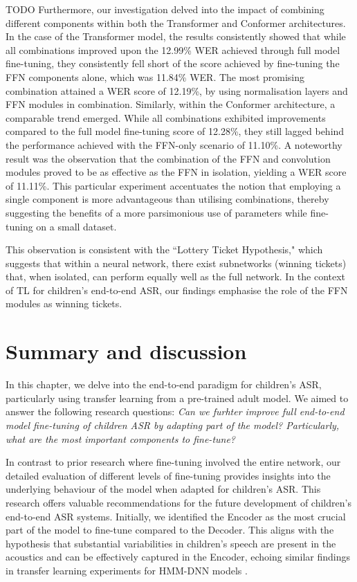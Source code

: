 TODO
Furthermore, our investigation delved into the impact of combining different components within both the Transformer and Conformer architectures. In the case of the Transformer model, the results consistently showed that while all combinations improved upon the 12.99\% \ac{WER} achieved through full model fine-tuning, they consistently fell short of the score achieved by fine-tuning the \ac{FFN} components alone, which was 11.84\% \ac{WER}. The most promising combination attained a \ac{WER} score of 12.19\%, by using normalisation layers and \ac{FFN} modules in combination.
Similarly, within the Conformer architecture, a comparable trend emerged. While all combinations exhibited improvements compared to the full model fine-tuning score of 12.28\%, they still lagged behind the performance achieved with the \ac{FFN}-only scenario of 11.10\%. A noteworthy result was the observation that the combination of the \ac{FFN} and convolution modules proved to be as effective as the \ac{FFN} in isolation, yielding a \ac{WER} score of 11.11\%. This particular experiment accentuates the notion that employing a single component is more advantageous than utilising combinations, thereby suggesting the benefits of a more parsimonious use of parameters while fine-tuning on a small dataset.

This observation is consistent with the ``Lottery Ticket Hypothesis," which suggests that within a neural network, there exist subnetworks (winning tickets) that, when isolated, can perform equally well as the full network. In the context of \ac{TL} for children's end-to-end \ac{ASR}, our findings emphasise the role of the \ac{FFN} modules as winning tickets.

\section{Summary and discussion}

In this chapter, we delve into the end-to-end paradigm for children's \ac{ASR}, particularly using transfer learning from a pre-trained adult model. We aimed to answer the following research questions: \textit{Can we furhter improve full end-to-end model fine-tuning of children \ac{ASR} by adapting part of the model? Particularly, what are the most important components to fine-tune?}

In contrast to prior research where fine-tuning involved the entire network, our detailed evaluation of different levels of fine-tuning provides insights into the underlying behaviour of the model when adapted for children's \ac{ASR}. This research offers valuable recommendations for the future development of children's end-to-end \ac{ASR} systems. Initially, we identified the Encoder as the most crucial part of the model to fine-tune compared to the Decoder. This aligns with the hypothesis that substantial variabilities in children's speech are present in the acoustics and can be effectively captured in the Encoder, echoing similar findings in transfer learning experiments for \ac{HMM-DNN} models \cite{TFchildren}.

